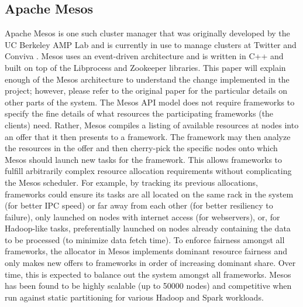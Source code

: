 \subsection{Apache Mesos}
Apache Mesos is one such cluster manager that was originally developed by the UC Berkeley AMP
Lab and is currently in use to manage clusters at Twitter and Conviva \cite{mesos-paper,
mesos-website}. Mesos uses an event-driven architecture and is written in C++ and built on top
of the Libprocess and Zookeeper libraries. This paper will explain enough of the Mesos
architecture to understand the change implemented in the project; however, please refer to the
original paper \cite{mesos-paper} for the particular details on other parts of the system. The
Mesos API model does not require frameworks to specify the fine details of what resources the
participating frameworks (the clients) need.  Rather, Mesos compiles a listing of available
resources at nodes into an offer that it then presents to a framework. The framework may then
analyze the resources in the offer and then cherry-pick the specific nodes onto which Mesos
should launch new tasks for the framework. This allows frameworks to fulfill arbitrarily
complex resource allocation requirements without complicating the Mesos scheduler. For example,
by tracking its previous allocations, frameworks could ensure its tasks are all located on the
same rack in the system (for better IPC speed) or far away from each other (for better
resiliency to failure), only launched on nodes with internet access (for webservers), or, for
Hadoop-like tasks, preferentially launched on nodes already containing the data to be processed
(to minimize data fetch time). To enforce fairness amongst all frameworks, the allocator in
Mesos implements dominant resource fairness \cite{drf-paper} and only makes new offers to
frameworks in order of increasing dominant share. Over time, this is expected to balance out
the system amongst all frameworks. Mesos has been found to be highly scalable (up to 50000
nodes) and competitive when run against static partitioning for various Hadoop and Spark
workloads.

